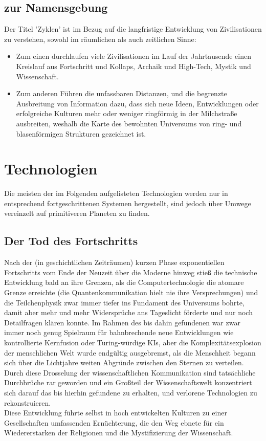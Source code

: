 \documentclass[10pt,a4paper]{report}
\begin{document}
\section*{zur Namensgebung}
Der Titel 'Zyklen' ist im Bezug auf die langfristige Entwicklung von Zivilisationen zu verstehen, sowohl im räumlichen als auch zeitlichen Sinne:
\begin{itemize}
\item Zum einen durchlaufen viele Zivilisationen im Lauf der Jahrtausende einen Kreislauf aus Fortschritt und Kollaps, Archaik und High-Tech, Mystik und Wissenschaft.
\item Zum anderen Führen die unfassbaren Distanzen, und die begrenzte Ausbreitung von Information dazu, dass sich neue Ideen, Entwicklungen oder erfolgreiche Kulturen mehr oder weniger ringförmig in der Milchstraße ausbreiten, weshalb die Karte des bewohnten Universums von ring- und blasenförmigen Strukturen gezeichnet ist.
\end{itemize}

\chapter{Technologien}

Die meisten der im Folgenden aufgelisteten Technologien werden nur in entsprechend fortgeschrittenen Systemen hergestellt, sind jedoch über Umwege vereinzelt auf primitiveren Planeten zu finden.

\section{Der Tod des Fortschritts}
Nach der (in geschichtlichen Zeiträumen) kurzen Phase exponentiellen Fortschritts vom Ende der Neuzeit über die Moderne hinweg stieß die technische Entwicklung bald an ihre Grenzen, als die Computertechnologie die atomare Grenze erreichte (die Quantenkommunikation hielt nie ihre Versprechungen) und die Teilchenphysik zwar immer tiefer ins Fundament des Universums bohrte, damit aber mehr und mehr Widersprüche ans Tageslicht förderte und nur noch Detailfragen klären konnte. Im Rahmen des bis dahin gefundenen war zwar immer noch genug Spielraum für bahnbrechende neue Entwicklungen wie kontrollierte Kernfusion oder Turing-würdige KIs, aber die Komplexitätsexplosion der menschlichen Welt wurde endgültig ausgebremst, als die Menschheit begann sich über die Lichtjahre weiten Abgründe zwischen den Sternen zu verteilen. Durch diese Drosselung der wissenschaftlichen Kommunikation sind tatsächliche Durchbrüche rar geworden und ein Großteil der Wissenschaftswelt konzentriert sich darauf das bis hierhin gefundene zu erhalten, und verlorene Technologien zu rekonstruieren.\\
Diese Entwicklung führte selbst in hoch entwickelten Kulturen zu einer Ge\-sell\-schaf\-ten umfassenden Ernüch\-terung, die den Weg ebnete für ein Wiedererstarken der Religionen und die Mystifizierung der Wissenschaft.
\end{document}
